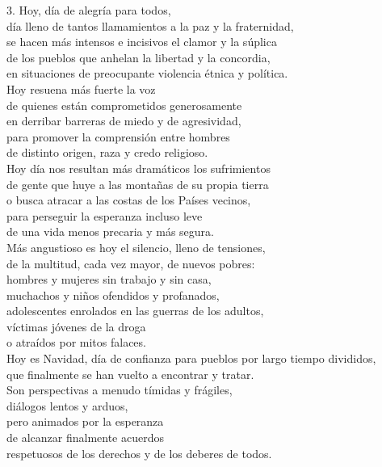 3. Hoy, día de alegría para todos,\\
día lleno de tantos llamamientos a la paz y la fraternidad,\\
se hacen más intensos e incisivos el clamor y la súplica\\
de los pueblos que anhelan la libertad y la concordia,\\
en situaciones de preocupante violencia étnica y política.\\
Hoy resuena más fuerte la voz\\
de quienes están comprometidos generosamente\\
en derribar barreras de miedo y de agresividad,\\
para promover la comprensión entre hombres\\
de distinto origen, raza y credo religioso.\\
Hoy día nos resultan más dramáticos los sufrimientos\\
de gente que huye a las montañas de su propia tierra\\
o busca atracar a las costas de los Países vecinos,\\
para perseguir la esperanza incluso leve\\
de una vida menos precaria y más segura.\\
Más angustioso es hoy el silencio, lleno de tensiones,\\
de la multitud, cada vez mayor, de nuevos pobres:\\
hombres y mujeres sin trabajo y sin casa,\\
muchachos y niños ofendidos y profanados,\\
adolescentes enrolados en las guerras de los adultos,\\
víctimas jóvenes de la droga\\
o atraídos por mitos falaces.\\
Hoy es Navidad, día de confianza para pueblos por largo tiempo
divididos,\\
que finalmente se han vuelto a encontrar y tratar.\\
Son perspectivas a menudo tímidas y frágiles,\\
diálogos lentos y arduos,\\
pero animados por la esperanza\\
de alcanzar finalmente acuerdos\\
respetuosos de los derechos y de los deberes de todos.

